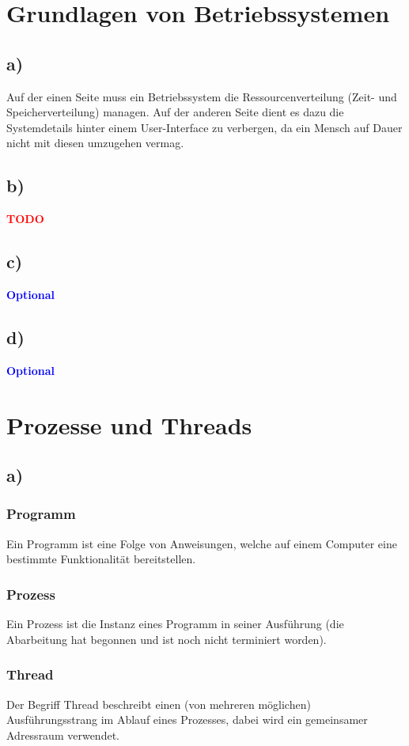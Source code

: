 \documentclass[a4paper,11pt]{scrartcl}
\title{\titleinfo}
\author{\authorinfo}
\newcommand{\todo}{\textcolor{red}{\textbf{TODO}}}
\newcommand{\opt}{\textcolor{blue}{\textbf{Optional}}}
\begin{document}
\maketitle

\section*{Grundlagen von Betriebssystemen}
\subsection*{a)}
Auf der einen Seite muss ein Betriebssystem die Ressourcenverteilung (Zeit- und Speicherverteilung)
managen. Auf der anderen Seite dient es dazu die Systemdetails hinter einem User-Interface zu verbergen,
da ein Mensch auf Dauer nicht mit diesen umzugehen vermag.
\subsection*{b)} \todo
\subsection*{c)} \opt
\subsection*{d)} \opt

\section*{Prozesse und Threads}
\subsection*{a)} 
\subsubsection*{Programm}
Ein Programm ist eine Folge von Anweisungen, welche auf einem Computer eine bestimmte Funktionalität bereitstellen.
\subsubsection*{Prozess}
Ein Prozess ist die Instanz eines Programm in seiner Ausführung (die Abarbeitung hat begonnen und ist noch nicht terminiert worden). 
\subsubsection*{Thread}
Der Begriff Thread beschreibt einen (von mehreren möglichen) Ausführungsstrang im Ablauf eines Prozesses, dabei wird ein gemeinsamer Adressraum verwendet.
\end{document}
